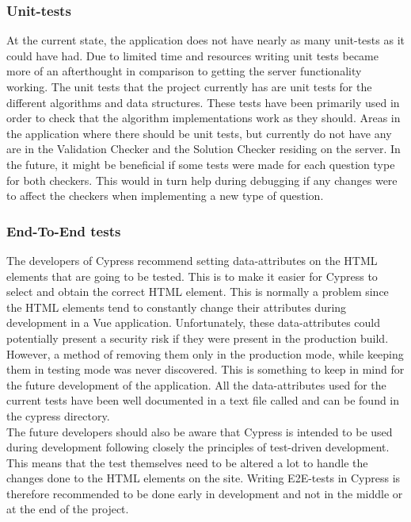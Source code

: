 \subsubsection{Unit-tests}
At the current state, the application does not have nearly as many unit-tests as it could have had. Due to limited time and resources writing unit tests became more of an afterthought in comparison to getting the server functionality working. The unit tests that the project currently has are unit tests for the different algorithms and data structures. These tests have been primarily used in order to check that the algorithm implementations work as they should. Areas in the application where there should be unit tests, but currently do not have any are in the Validation Checker and the Solution Checker residing on the server. In the future, it might be beneficial if some tests were made for each question type for both checkers. This would in turn help during debugging if any changes were to affect the checkers when implementing a new type of question.
\subsubsection{End-To-End tests}
The developers of Cypress recommend setting data-attributes on the HTML elements that are going to be tested. This is to make it easier for Cypress to select and obtain the correct HTML element. This is normally a problem since the HTML elements tend to constantly change their attributes during development in a Vue application. Unfortunately, these data-attributes could potentially present a security risk if they were present in the production build. However, a method of removing them only in the production mode, while keeping them in testing mode was never discovered. This is something to keep in mind for the future development of the application. All the data-attributes used for the current tests have been well documented in a text file called  and can be found in the cypress directory.\cite{Cypress:BestPractise}
\\[11pt] 
The future developers should also be aware that Cypress is intended to be used during development following closely the principles of test-driven development. This means that the test themselves need to be altered a lot to handle the changes done to the HTML elements on the site. Writing E2E-tests in Cypress is therefore recommended to be done early in development and not in the middle or at the end of the project.

